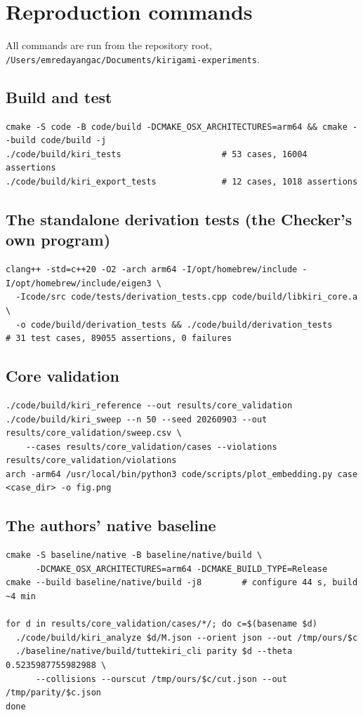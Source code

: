 \documentclass[10pt,a4paper]{article}
\newcommand{\fn}[1]{\nolinkurl{#1}}
\begin{document}
\section{Reproduction commands}

All commands are run from the repository root,
\fn{/Users/emredayangac/Documents/kirigami-experiments}.

\subsection*{Build and test}
\begin{lstlisting}
cmake -S code -B code/build -DCMAKE_OSX_ARCHITECTURES=arm64 && cmake --build code/build -j
./code/build/kiri_tests                    # 53 cases, 16004 assertions
./code/build/kiri_export_tests             # 12 cases, 1018 assertions
\end{lstlisting}

\subsection*{The standalone derivation tests (the Checker's own program)}
\begin{lstlisting}
clang++ -std=c++20 -O2 -arch arm64 -I/opt/homebrew/include -I/opt/homebrew/include/eigen3 \
  -Icode/src code/tests/derivation_tests.cpp code/build/libkiri_core.a \
  -o code/build/derivation_tests && ./code/build/derivation_tests
# 31 test cases, 89055 assertions, 0 failures
\end{lstlisting}

\subsection*{Core validation}
\begin{lstlisting}
./code/build/kiri_reference --out results/core_validation
./code/build/kiri_sweep --n 50 --seed 20260903 --out results/core_validation/sweep.csv \
    --cases results/core_validation/cases --violations results/core_validation/violations
arch -arm64 /usr/local/bin/python3 code/scripts/plot_embedding.py case <case_dir> -o fig.png
\end{lstlisting}

\subsection*{The authors' native baseline}
\begin{lstlisting}
cmake -S baseline/native -B baseline/native/build \
      -DCMAKE_OSX_ARCHITECTURES=arm64 -DCMAKE_BUILD_TYPE=Release
cmake --build baseline/native/build -j8        # configure 44 s, build ~4 min

for d in results/core_validation/cases/*/; do c=$(basename $d)
  ./code/build/kiri_analyze $d/M.json --orient json --out /tmp/ours/$c
  ./baseline/native/build/tuttekiri_cli parity $d --theta 0.5235987755982988 \
      --collisions --ourscut /tmp/ours/$c/cut.json --out /tmp/parity/$c.json
done
\end{lstlisting}
\end{document}
